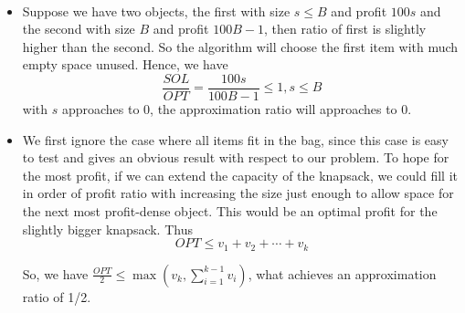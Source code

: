 \documentclass[12pt]{article}
\newenvironment{solution}[2][Solution]{\begin{trivlist}
\item[\hskip \labelsep {\bfseries #1}\hskip \labelsep {\bfseries #2.}]}{\end{trivlist}}
\begin{document}
\begin{solution}{5}
    ~

    \begin{itemize}
        \item Suppose we have two objects, the first with size $s \le B$ and profit $100s$ and the second with size $B$ and profit $100B-1$, then
        ratio of first is slightly higher than the second. So the algorithm will choose the first item with much empty space unused.
        Hence, we have
        \[\frac{SOL}{OPT} = \frac{100s}{100B-1} \le 1, s \le B\]
        with $s$ approaches to 0, the approximation ratio will approaches to 0.
        \item We first ignore the case where all items fit in the bag, since this case is easy to test and gives an obvious result with respect to our problem.
        To hope for the most profit, if we can extend the capacity of the knapsack, we could fill it in order of profit ratio with increasing the size just enough
        to allow space for the next most profit-dense object. This would be an optimal profit for the slightly bigger knapsack. Thus
        \[OPT \le v_1 + v_2 + \cdots + v_k\]
        
        So, we have $\frac{OPT}{2} \le \max(v_k, \sum_{i=1}^{k-1}v_i)$, what achieves an approximation ratio of 1/2.
    \end{itemize}
    
\end{solution}
\end{document}
